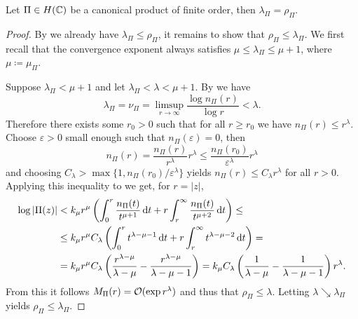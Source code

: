 \begin{theorem} \label{thm:exponent-of-convergence-Weierstraß-product}
    Let $\Pi \in H(\mathbb{C})$ be a canonical product of finite order, then $\lambda_\Pi = \rho_\Pi$.
\end{theorem}

\begin{proof}
    By  we already have $\lambda_\Pi \leq \rho_\Pi$, it remains to show that $\rho_\Pi \leq \lambda_\Pi$. We first recall that the convergence exponent always satisfies $\mu \leq \lambda_\Pi \leq \mu + 1$, where $\mu \coloneqq \mu_\Pi$.
    
    Suppose $\lambda_\Pi < \mu + 1$ and let $\lambda_\Pi < \lambda < \mu + 1$. By  we have
    $$ \lambda_\Pi = \nu_\Pi = \limsup_{r \to \infty} \frac{\log n_\Pi(r)}{\log r} < \lambda. $$
    Therefore there exists some $r_0 > 0$ such that for all $r \geq r_0$ we have $n_\Pi(r) \leq r^\lambda$. Choose $\varepsilon > 0$ small enough such that $n_\Pi(\varepsilon) = 0$, then
    \begin{equation*}
        n_\Pi(r) = \frac{n_\Pi(r)}{r^\lambda} r^\lambda \leq \frac{n_\Pi(r_0)}{\varepsilon^\lambda} r^\lambda
    \end{equation*}
    and choosing $C_\lambda > \max \{ 1, n_\Pi(r_0) / \varepsilon^\lambda \}$ yields $n_\Pi(r) \leq C_\lambda r^\lambda$ for all $r > 0$. Applying this inequality to  we get, for $r = \vert z \vert$,
    \begin{align*}
        \log \vert \Pi(z) \vert &< k_\mu r^\mu \left( \int_0^r \frac{n_\Pi(t)}{t^{\mu + 1}} \mathop{}\!\mathrm{d} t + r \int_r^\infty \frac{n_\Pi(t)}{t^{\mu + 2}} \mathop{}\!\mathrm{d} t \right) \leq \\
        &\leq k_\mu r^\mu C_\lambda \left( \int_0^r t^{\lambda - \mu - 1} \mathop{}\!\mathrm{d} t + r \int_r^\infty t^{\lambda - \mu - 2} \mathop{}\!\mathrm{d} t \right) = \\
        &= k_\mu r^\mu C_\lambda \left( \frac{r^{\lambda - \mu}}{\lambda - \mu} - \frac{r^{\lambda - \mu}}{\lambda - \mu - 1} \right) = k_\mu C_\lambda \left( \frac{1}{\lambda - \mu} - \frac{1}{\lambda - \mu - 1} \right) r^\lambda.
    \end{align*}
    From this it follows $M_\Pi(r) = \mathcal{O}(\exp r^\lambda)$ and thus that $\rho_\Pi \leq \lambda$. Letting $\lambda \searrow \lambda_\Pi$ yields $\rho_\Pi \leq \lambda_\Pi$.


\end{proof}
